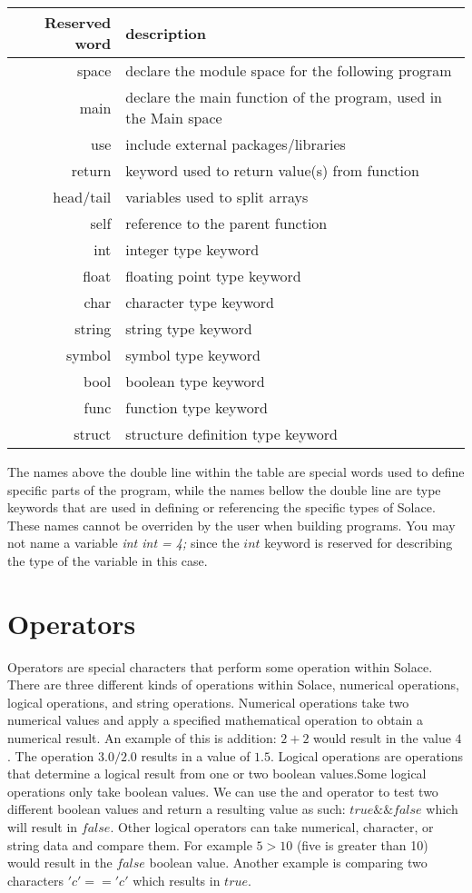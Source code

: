 \documentclass{article}
\begin{document}
\begin{center}
\begin{tabular}{|r|l|}
\hline
Reserved word & description \\
\hline
\hline
space & declare the module space for the following program \\
main & declare the main function of the program, used in the Main space \\
use & include external packages/libraries \\
return & keyword used to return value(s) from function \\
head/tail & variables used to split arrays \\
self & reference to the parent function \\
\hline
\hline
int & integer type keyword \\
float & floating point type keyword \\
char & character type keyword \\
string & string type keyword \\
symbol & symbol type keyword \\
bool & boolean type keyword \\
func & function type keyword \\
struct & structure definition type keyword \\
\hline
\end{tabular}
\end{center}

The names above the double line within the table are special words used to define specific parts of the program, while the names bellow the double line are type keywords that
are used in defining or referencing the specific types of Solace. These names cannot be overriden by the user when building programs. You may not name a variable
\textit{int int = 4;} since the $int$ keyword is reserved for describing the type of the variable in this case.

\section{Operators}

Operators are special characters that perform some operation within Solace. There are three different kinds of operations within Solace, numerical operations, logical operations,
and string operations. Numerical operations take two numerical values and apply a specified mathematical operation to obtain a numerical result. An example of this is addition:
$2 + 2$ would result in the value $4$. The operation $3.0 / 2.0$ results in a value of $1.5$. Logical operations are operations that determine a logical result from one or two
boolean values.Some logical operations only take boolean values. We can use the and operator to test two different boolean values and return a resulting value as such: $true \&\& false$
which will result in $false$. Other logical operators can take numerical, character, or string data and compare them. For example $5 > 10$ (five is greater than 10) would result in
the $false$ boolean value. Another example is comparing two characters $'c' == 'c'$ which results in $true$.
\end{document}
